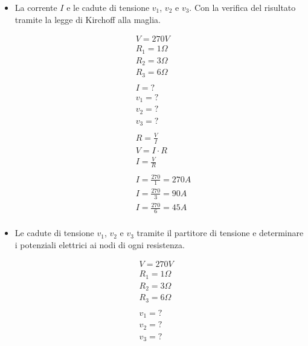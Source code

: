 \documentclass[fleqn]{exam}
\begin{document}
    \begin{itemize}
        \item La corrente $I$ e le cadute di tensione $v_1$, $v_2$ e $v_3$. Con la verifica del risultato tramite la legge di Kirchoff alla maglia.
        
        \begin{align*}
        	&V = 270V \\
            &R_1 = 1\Omega \\
            &R_2 = 3\Omega \\
            &R_3 = 6\Omega \\ \\
            &I = ? \\
            &v_1 = ? \\
            &v_2 = ? \\
            &v_3 = ? \\ \\
            &R = \frac{V}{I} \\
            &V = I \cdot R \\
            &I = \frac{V}{R} \\ \\
            &I = \frac{270}{1} = 270 A \\
            &I = \frac{270}{3} = 90 A \\
            &I = \frac{270}{6} = 45 A \\
            &
        \end{align*}
        
        \item Le cadute di tensione $v_1$, $v_2$ e $v_3$ tramite il partitore di tensione e determinare i potenziali elettrici ai nodi di ogni resistenza.
    \end{itemize}

    \begin{align*}
        &V = 270V \\
        &R_1 = 1\Omega \\
        &R_2 = 3\Omega \\
        &R_3 = 6\Omega \\ \\
        &v_1 = ? \\
        &v_2 = ? \\
        &v_3 = ? \\
    \end{align*}

\pagebreak
\end{document}
